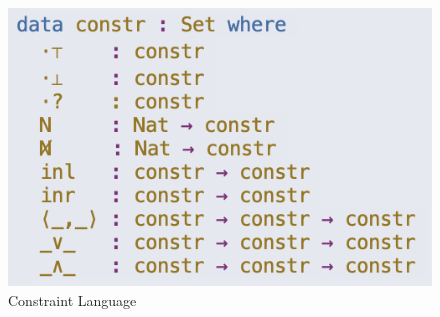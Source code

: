 \begin{figure}[ht]
	\centering
	\includegraphics[scale=0.47,valign=t]{imgs/agda-syntax.png}%
	\caption{Constraint Language}
	\label{fig:agda-syntax}
\end{figure}